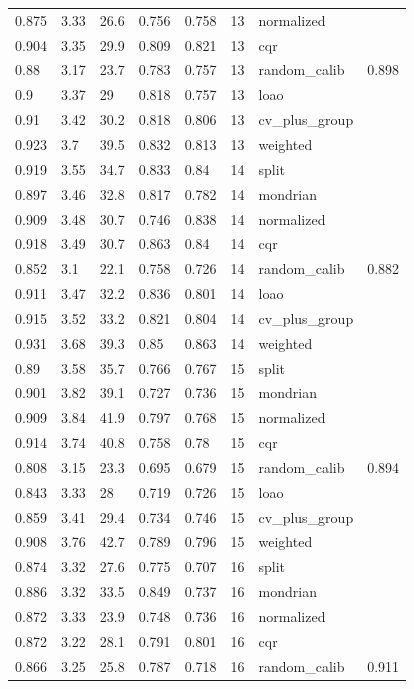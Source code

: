 \begin{tabular}{llllllll}
0.875 & 3.33 & 26.6 & 0.756 & 0.758 & 13 & normalized &  \\
0.904 & 3.35 & 29.9 & 0.809 & 0.821 & 13 & cqr &  \\
0.88 & 3.17 & 23.7 & 0.783 & 0.757 & 13 & random\_calib & 0.898 \\
0.9 & 3.37 & 29 & 0.818 & 0.757 & 13 & loao &  \\
0.91 & 3.42 & 30.2 & 0.818 & 0.806 & 13 & cv\_plus\_group &  \\
0.923 & 3.7 & 39.5 & 0.832 & 0.813 & 13 & weighted &  \\
0.919 & 3.55 & 34.7 & 0.833 & 0.84 & 14 & split &  \\
0.897 & 3.46 & 32.8 & 0.817 & 0.782 & 14 & mondrian &  \\
0.909 & 3.48 & 30.7 & 0.746 & 0.838 & 14 & normalized &  \\
0.918 & 3.49 & 30.7 & 0.863 & 0.84 & 14 & cqr &  \\
0.852 & 3.1 & 22.1 & 0.758 & 0.726 & 14 & random\_calib & 0.882 \\
0.911 & 3.47 & 32.2 & 0.836 & 0.801 & 14 & loao &  \\
0.915 & 3.52 & 33.2 & 0.821 & 0.804 & 14 & cv\_plus\_group &  \\
0.931 & 3.68 & 39.3 & 0.85 & 0.863 & 14 & weighted &  \\
0.89 & 3.58 & 35.7 & 0.766 & 0.767 & 15 & split &  \\
0.901 & 3.82 & 39.1 & 0.727 & 0.736 & 15 & mondrian &  \\
0.909 & 3.84 & 41.9 & 0.797 & 0.768 & 15 & normalized &  \\
0.914 & 3.74 & 40.8 & 0.758 & 0.78 & 15 & cqr &  \\
0.808 & 3.15 & 23.3 & 0.695 & 0.679 & 15 & random\_calib & 0.894 \\
0.843 & 3.33 & 28 & 0.719 & 0.726 & 15 & loao &  \\
0.859 & 3.41 & 29.4 & 0.734 & 0.746 & 15 & cv\_plus\_group &  \\
0.908 & 3.76 & 42.7 & 0.789 & 0.796 & 15 & weighted &  \\
0.874 & 3.32 & 27.6 & 0.775 & 0.707 & 16 & split &  \\
0.886 & 3.32 & 33.5 & 0.849 & 0.737 & 16 & mondrian &  \\
0.872 & 3.33 & 23.9 & 0.748 & 0.736 & 16 & normalized &  \\
0.872 & 3.22 & 28.1 & 0.791 & 0.801 & 16 & cqr &  \\
0.866 & 3.25 & 25.8 & 0.787 & 0.718 & 16 & random\_calib & 0.911 \\

\end{tabular}
